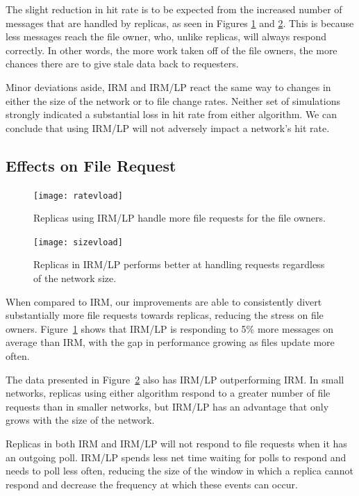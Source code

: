 \documentclass[10pt, conference, compsocconf, letterpaper]{IEEEtran} %
\begin{document}
The slight reduction in hit rate is to be expected from the increased number of messages that are handled by replicas, as seen in Figures \ref{ratevload} and  \ref{sizevload}.  This is because less messages reach the file owner, who, unlike replicas, will always respond correctly.   In other words, the more work taken off of the file owners, the more chances there are to give stale data back to requesters.

Minor deviations aside, IRM and IRM/LP react the same way to changes in either the size of the network or to file change rates.  Neither set of simulations strongly indicated a substantial loss in hit rate from either algorithm. We can conclude that using IRM/LP will not adversely impact a network's hit rate.

\subsection{Effects on File Request}

\begin{figure}
\texttt{[image: ratevload]}
\caption{Replicas using IRM/LP handle more file requests for the file owners.}
\label{ratevload}
\end{figure}




\begin{figure}
\texttt{[image: sizevload]}
\caption{Replicas in IRM/LP performs better at handling requests regardless of the network size.}
\label{sizevload}
\end{figure}





When compared to IRM, our improvements are able to consistently divert substantially more file requests towards replicas, reducing the stress on file owners.  Figure~\ref{ratevload} shows that IRM/LP is responding to 5\% more messages on average than IRM, with the gap in performance growing as files update more often.  

The data presented in Figure~\ref{sizevload} also has IRM/LP outperforming IRM.  In small networks, replicas using  either algorithm respond to a greater number of file requests than in smaller networks, but IRM/LP has an advantage that only grows with the size of the network.

Replicas in both IRM  and IRM/LP will not respond to file requests when it has an outgoing poll.  IRM/LP spends less net time waiting for polls to respond and needs to poll less often, reducing the size of the window in which a replica cannot respond and decrease the frequency at which these events can occur. 
\end{document}
